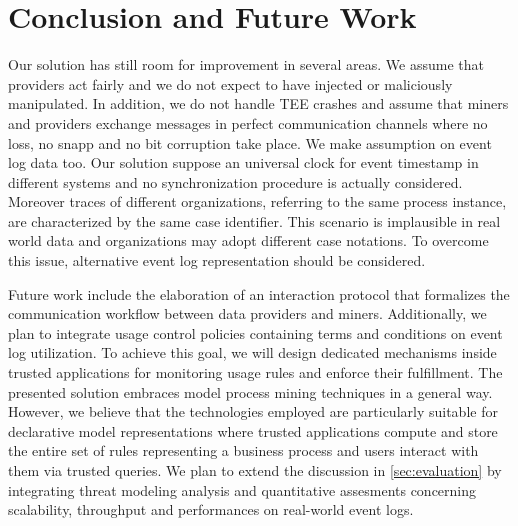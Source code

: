 \section{Conclusion and Future Work}
\label{sec:conclusion}


Our solution has still room for improvement in several areas. We assume that providers act fairly and we do not expect to have injected or maliciously manipulated. In addition, we do not handle TEE crashes and assume that miners and providers exchange messages in perfect communication channels where no loss, no snapp and no bit corruption take place. We make assumption on event log data too. Our solution suppose an universal clock for event timestamp in different systems and no synchronization procedure is actually considered. Moreover traces of different organizations, referring to the same process instance, are characterized by the same case identifier. This scenario is implausible in real world data and organizations may adopt different case notations. To overcome this issue, alternative event log representation should be considered.

Future work include the elaboration of an interaction protocol that formalizes the communication workflow between data providers and miners. Additionally, we plan to integrate usage control policies containing terms and conditions on event log utilization. To achieve this goal, we will design dedicated mechanisms inside trusted applications for monitoring usage rules and enforce their fulfillment. The presented solution embraces model process mining techniques in a general way. However, we believe that the technologies employed are particularly suitable for declarative model representations where trusted applications compute and store the entire set of rules representing a business process and users interact with them via trusted queries. We plan to extend the discussion in \cref{sec:evaluation} by integrating threat modeling analysis and quantitative assesments concerning scalability, throughput and performances on real-world event logs.

